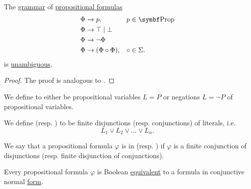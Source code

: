 \begin{proposition}\label{thm:propositional_formulas_are_unambiguous}
  The \hyperref[def:grammar]{grammar} of \hyperref[def:propositional_language]{propositional formulas}
  \begin{displaymath}
    \begin{aligned}
      &\Phi \to p,                 &&p \in \Bold{Prop} \\
      &\Phi \to \top \;|\; \bot    && \\
      &\Phi \to \neg \Phi          && \\
      &\Phi \to (\Phi \circ \Phi), &&\circ \in \Sigma.
    \end{aligned}
  \end{displaymath}
  is \hyperref[def:ambiguous_grammar]{unambiguous}.
\end{proposition}
\begin{proof}
  The proof is analogous to .
\end{proof}

\begin{definition}\label{def:conjunctive_normal_form}
  We define  to either be propositional variables \( L = P \) or negations \( L = \neg P \) of propositional variables.

  We define  (resp. ) to be finite disjunctions (resp. conjunctions) of literals, i.e.
  \begin{equation*}
    L_1 \vee L_2 \vee \ldots \vee L_n.
  \end{equation*}

  We say that a propositional formula \( \varphi \) is in  (resp. ) if \( \varphi \) is a finite conjunction of disjunctions (resp. finite disjunction of conjunctions).
\end{definition}

\begin{proposition}\label{thm:conjunctive_normal_form_reduction}
  Every propositional formula \( \varphi \) is Boolean \hyperref[def:propositional_interpretation]{equivalent} to a formula in conjunctive normal \hyperref[def:conjunctive_normal_form]{form}.
\end{proposition}


